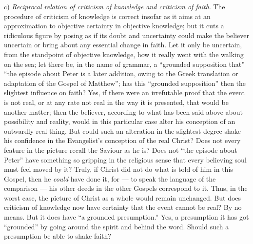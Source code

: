 \documentclass[12pt,a4paper,openany]{book}
\newcommand{\opage}[1]{\marginnote{\footnotesize\textit{[#1]}}}
\begin{document}
c) \emph{Reciprocal relation of criticism of knowledge and criticism of faith}.
The procedure of criticism of knowledge is correct
insofar as it aims at an approximation to objective
certainty in objective knowledge; but it cuts a ridiculous figure
by posing as if its doubt and uncertainty could
make the believer uncertain or bring about any
essential change in faith. Let it only be uncertain, from the standpoint
of objective knowledge, how it really
went with the walking on the sea; let there be, in the
name of grammar, a ``grounded supposition that''
``the episode about Peter is a later addition, owing to
the Greek translation or adaptation of the Gospel of Matthew'';
has this ``grounded supposition'' then the
slightest influence on faith? Yes, if there were an
irrefutable proof that the event is not real,
or at any rate not real in the way it is presented, that
would be another matter; then the believer, according to what has been said above
about possibility and reality, would in this particular
case alter his conception of an outwardly real thing.
But could such an alteration in the slightest degree
shake his confidence in the Evangelist's conception of the
real Christ? Does not every feature in the picture recall
the Saviour as he is? Does not ``the episode about Peter''
have something so gripping in the religious sense that every believing
\setcounter{footnote}{0}%
\opage{27}soul must feel moved by it? Truly, if Christ
did not do what is told of him in this Gospel,
then he \emph{could} have done it, for --- to
speak the language of the comparison --- his other deeds in
the other Gospels correspond to it. Thus, in the worst case,
the picture of Christ as a whole would remain unchanged.
But does criticism of knowledge now have certainty that the event
cannot be real? By no means. But it does
have ``a grounded presumption.'' Yes, a presumption it
has got ``grounded'' by going around the spirit and
behind the word. Should such a presumption be able to
shake faith?
\end{document}
